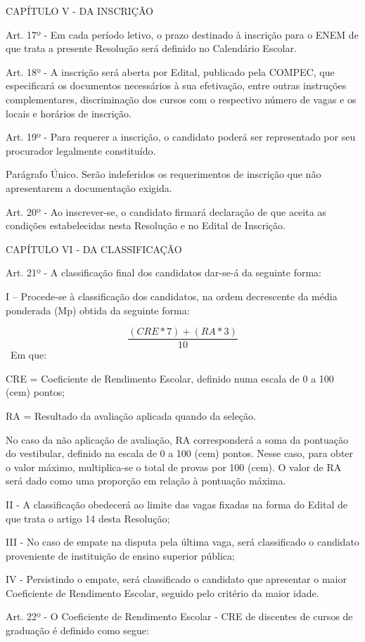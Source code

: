 CAPÍTULO V - DA INSCRIÇÃO


Art. 17º - Em cada período letivo, o prazo destinado à inscrição para o ENEM de que trata a presente Resolução será definido no Calendário Escolar.

Art. 18º - A inscrição será aberta por Edital, publicado pela COMPEC, que especificará os documentos necessários à sua efetivação, entre outras instruções complementares, discriminação dos cursos com o respectivo número de vagas e os locais e horários de inscrição.

Art. 19º - Para requerer a inscrição, o candidato poderá ser representado por seu procurador legalmente constituído.

Parágrafo Único. Serão indeferidos os requerimentos de inscrição que não apresentarem a documentação exigida.

Art. 20º - Ao inscrever-se, o candidato firmará declaração de que aceita as condições estabelecidas nesta Resolução e no Edital de Inscrição.


CAPÍTULO VI - DA CLASSIFICAÇÃO


Art. 21º - A classificação final dos candidatos dar-se-á da seguinte forma:

I – Procede-se à classificação dos candidatos, na ordem decrescente da média ponderada (Mp) obtida da seguinte forma:

$$ 
\frac{(CRE*7) + (RA*3)}{10}
$$
~Em que:

CRE = Coeficiente de Rendimento Escolar, definido numa escala de 0 a 100 (cem) pontos;

RA = Resultado da avaliação aplicada quando da seleção.

No caso da não aplicação de avaliação, RA corresponderá a soma da pontuação do vestibular, definido na escala de 0 a 100 (cem) pontos. Nesse caso, para obter o valor máximo, multiplica-se o total de provas por 100 (cem). O valor de RA será dado como uma proporção em relação à pontuação máxima.

II - A classificação obedecerá ao limite das vagas fixadas na forma do Edital de que trata o artigo 14 desta Resolução;

III - No caso de empate na disputa pela última vaga, será classificado o candidato proveniente de instituição de ensino superior pública;

IV - Persistindo o empate, será classificado o candidato que apresentar o maior Coeficiente de Rendimento Escolar, seguido pelo critério da maior idade.

Art. 22º - O Coeficiente de Rendimento Escolar - CRE de discentes de cursos de graduação é definido como segue:

